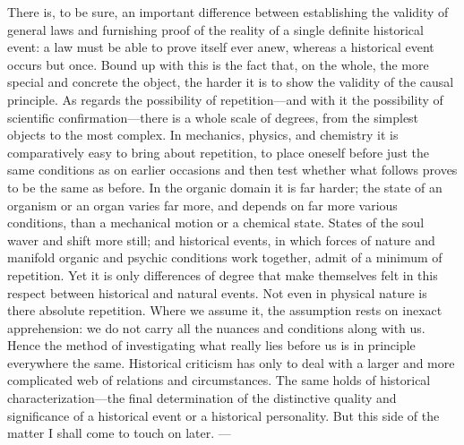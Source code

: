 \documentclass[12pt,a4paper]{article}
\newcommand{\opage}[1]{\marginnote{\footnotesize\textit{[#1]}}}
\begin{document}
There is, to be sure, an important difference between establishing the validity of
general laws and furnishing proof of the reality of a single definite historical
\opage{29}event: a law must be able to prove itself ever anew, whereas a historical event
occurs but once. Bound up with this is the fact that, on the whole, the more special
and concrete the object, the harder it is to show the validity of the causal
principle. As regards the possibility of repetition---and with it the possibility of
scientific confirmation---there is a whole scale of degrees, from the simplest
objects to the most complex. In mechanics, physics, and chemistry it is comparatively
easy to bring about repetition, to place oneself before just the same conditions as
on earlier occasions and then test whether what follows proves to be the same as
before.
In the organic domain it is far harder; the state of an organism or an organ varies
far more, and depends on far more various conditions, than a mechanical motion or a
chemical state. States of the soul waver and shift more still; and historical events,
in which forces of nature and manifold organic and psychic conditions work together,
admit of a minimum of repetition. Yet it is only differences of degree that make
themselves felt in this respect between historical and natural events. Not even in
physical nature is there absolute repetition. Where we assume it, the assumption
rests on inexact apprehension: we do not carry all the nuances and conditions along
with us. Hence the method of investigating what really lies before us is in principle
everywhere the same. Historical criticism has only to deal with a larger and more
complicated web of relations and circumstances. The same holds of historical
characterization---the final determination of the distinctive quality and
significance of a historical event or a historical personality. But this side of the
matter I shall come to touch on later. ---
\end{document}
